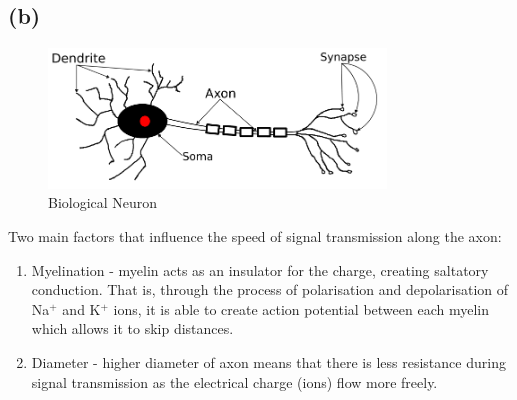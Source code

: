 \documentclass[a4paper]{article}
\theoremstyle{plain}
\theoremstyle{definition}
\theoremstyle{remark}
\begin{document}
\subsection{(b)}
\begin{figure}[H]
	\centering
	\includegraphics[width=0.8\textwidth]{neuron.png}
	\caption{Biological Neuron}
	\label{fig:neuron-png}
\end{figure}
Two main factors that influence the speed of signal transmission along the axon:
\begin{enumerate}
	\item Myelination - myelin acts as an insulator for the charge, creating saltatory conduction. That is, through the process of polarisation and depolarisation of Na${}^+$ and K${}^+$ ions, it is able to create action potential between each myelin which allows it to skip distances.
	\item Diameter - higher diameter of axon means that there is less resistance during signal transmission as the electrical charge (ions) flow more freely.
\end{enumerate}
\end{document}
